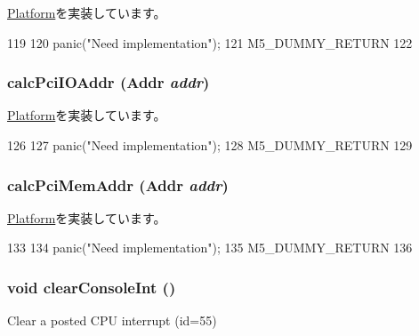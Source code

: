 \hyperlink{classPlatform_a4a2bdce1a8794dd3ea6ca12b36320433}{Platform}を実装しています。


\begin{DoxyCode}
119     {
120         panic("Need implementation\n");
121         M5_DUMMY_RETURN
122     }
\end{DoxyCode}
\hypertarget{classMalta_a83afd16479598cfaeb035fd30eeedd8b}{
\subsubsection[{calcPciIOAddr}]{ calcPciIOAddr ({\bf Addr} {\em addr})}}
\label{classMalta_a83afd16479598cfaeb035fd30eeedd8b}


\hyperlink{classPlatform_a3d1d55996e865ab1b65c732496c08b00}{Platform}を実装しています。


\begin{DoxyCode}
126     {
127         panic("Need implementation\n");
128         M5_DUMMY_RETURN
129     }
\end{DoxyCode}
\hypertarget{classMalta_aa2acd9bf04ba56b380e7812ce29971b5}{
\subsubsection[{calcPciMemAddr}]{ calcPciMemAddr ({\bf Addr} {\em addr})}}
\label{classMalta_aa2acd9bf04ba56b380e7812ce29971b5}


\hyperlink{classPlatform_a303d8161e77b31b8425cb320562a54b2}{Platform}を実装しています。


\begin{DoxyCode}
133     {
134         panic("Need implementation\n");
135         M5_DUMMY_RETURN
136     }
\end{DoxyCode}
\hypertarget{classMalta_ad38e46034c079c8e765d3ac7eb99337d}{
\subsubsection[{clearConsoleInt}]{\setlength{\rightskip}{0pt plus 5cm}void clearConsoleInt ()}}
\label{classMalta_ad38e46034c079c8e765d3ac7eb99337d}
Clear a posted CPU interrupt (id=55) 

